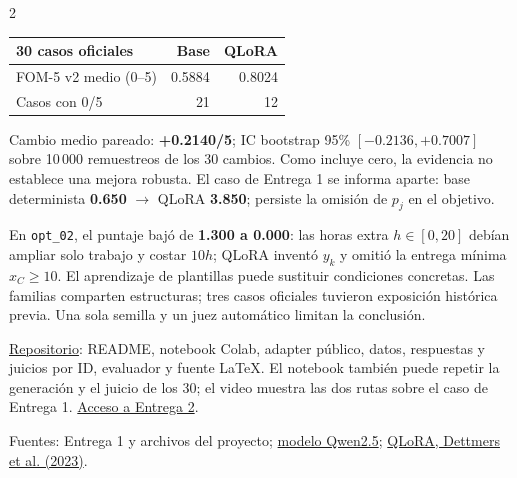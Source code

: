 \documentclass[10pt,a4paper]{extarticle}
\newcommand{\sect}[1]{\vspace{3pt}{\color{navy}\bfseries\large #1}\par\vspace{1pt}}
\begin{document}
\begin{multicols}{2}
\begin{center}\small
\begin{tabularx}{\linewidth}{@{}Xrr@{}}
\toprule
\textbf{30 casos oficiales} & \textbf{Base} & \textbf{QLoRA}\\
\midrule
FOM-5 v2 medio (0--5) & 0.5884 & 0.8024\\
Casos con 0/5 & 21 & 12\\
\bottomrule
\end{tabularx}
\end{center}
\vspace{-4pt}
\begin{center}
\end{center}
\vspace{-4pt}
Cambio medio pareado: \textbf{+0.2140/5}; IC bootstrap 95\% $[-0.2136,+0.7007]$ sobre 10\,000 remuestreos de los 30 cambios. Como incluye cero, la evidencia no establece una mejora robusta. El caso de Entrega 1 se informa aparte: base determinista \textbf{0.650} $\rightarrow$ QLoRA \textbf{3.850}; persiste la omisión de $p_j$ en el objetivo.

\sect{Falla y alcance}
En \texttt{opt\_02}, el puntaje bajó de \textbf{1.300 a 0.000}: las horas extra $h\in[0,20]$ debían ampliar solo trabajo y costar $10h$; QLoRA inventó $y_k$ y omitió la entrega mínima $x_C\ge10$. El aprendizaje de plantillas puede sustituir condiciones concretas. Las familias comparten estructuras; tres casos oficiales tuvieron exposición histórica previa. Una sola semilla y un juez automático limitan la conclusión.

\sect{Reproducción}
\href{https://github.com/Jose21531/GenAI-Optimization}{Repositorio}: README, notebook Colab, adapter público, datos, respuestas y juicios por ID, evaluador y fuente \LaTeX. El notebook también puede repetir la generación y el juicio de los 30; el video muestra las dos rutas sobre el caso de Entrega 1. \href{https://github.com/Jose21531/GenAI-Optimization/tree/main/Deliverable\%202}{Acceso a Entrega 2}.

{\scriptsize\color{navy}Fuentes: Entrega 1 y archivos del proyecto; \href{https://huggingface.co/Qwen/Qwen2.5-1.5B-Instruct}{modelo Qwen2.5}; \href{https://arxiv.org/abs/2305.14314}{QLoRA, Dettmers et al. (2023)}.}
\end{multicols}
\end{document}
